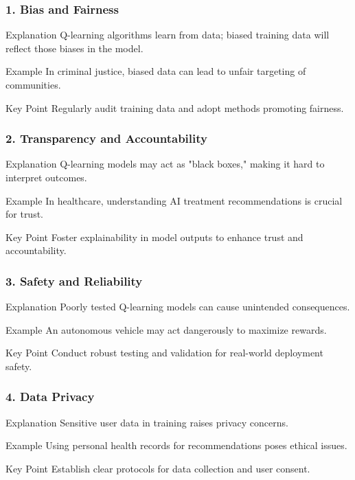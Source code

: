 \documentclass{beamer}
\begin{document}
\begin{frame}[fragile]
    \frametitle{1. Bias and Fairness}
    \begin{block}{Explanation}
        Q-learning algorithms learn from data; biased training data will reflect those biases in the model.
    \end{block}
    \begin{block}{Example}
        In criminal justice, biased data can lead to unfair targeting of communities.
    \end{block}
    \begin{block}{Key Point}
        Regularly audit training data and adopt methods promoting fairness.
    \end{block}
\end{frame}

\begin{frame}[fragile]
    \frametitle{2. Transparency and Accountability}
    \begin{block}{Explanation}
        Q-learning models may act as "black boxes," making it hard to interpret outcomes.
    \end{block}
    \begin{block}{Example}
        In healthcare, understanding AI treatment recommendations is crucial for trust.
    \end{block}
    \begin{block}{Key Point}
        Foster explainability in model outputs to enhance trust and accountability.
    \end{block}
\end{frame}

\begin{frame}[fragile]
    \frametitle{3. Safety and Reliability}
    \begin{block}{Explanation}
        Poorly tested Q-learning models can cause unintended consequences.
    \end{block}
    \begin{block}{Example}
        An autonomous vehicle may act dangerously to maximize rewards.
    \end{block}
    \begin{block}{Key Point}
        Conduct robust testing and validation for real-world deployment safety.
    \end{block}
\end{frame}

\begin{frame}[fragile]
    \frametitle{4. Data Privacy}
    \begin{block}{Explanation}
        Sensitive user data in training raises privacy concerns.
    \end{block}
    \begin{block}{Example}
        Using personal health records for recommendations poses ethical issues.
    \end{block}
    \begin{block}{Key Point}
        Establish clear protocols for data collection and user consent.
    \end{block}
\end{frame}
\end{document}
